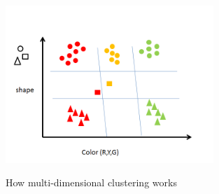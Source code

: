 \begin{figure}[ht]
  \centering
  \includegraphics[width=0.7\textwidth]{fig/multdim/example.png}\\
  \caption{How multi-dimensional clustering works}
  \label{fig:multidim}
\end{figure}
